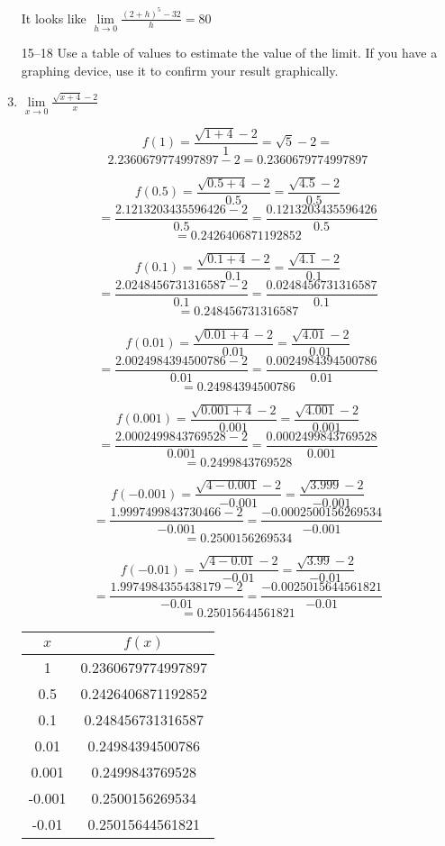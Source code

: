 \documentclass{article}
\begin{document}
\begin{enumerate}
			It looks like $\lim \limits _{h \to 0} \frac{(2 + h)^5 - 32}{h} = 80$
			
			\item[15--18] Use a table of values to estimate the value of the limit. If you have a graphing
				device, use it to confirm your result graphically.
				
			\item $\lim \limits _{x \to 0} \frac{\sqrt{x + 4} - 2}{x}$
			
				$$f(1) = \frac{\sqrt{1 + 4} - 2}{1} = \sqrt{5} - 2 = $$
				$$2.2360679774997897 - 2 = 0.2360679774997897$$
				
				$$f(0.5) = \frac{\sqrt{0.5 + 4} - 2}{0.5} =\frac{\sqrt{4.5} - 2}{0.5}$$
				$$= \frac{2.1213203435596426 - 2}{0.5} = \frac{0.1213203435596426}{0.5}$$
				$$ = 0.2426406871192852$$
				
				$$f(0.1) = \frac{\sqrt{0.1 + 4} - 2}{0.1} = \frac{\sqrt{4.1} - 2}{0.1}$$
				$$ = \frac{2.0248456731316587 - 2}{0.1} = \frac{0.0248456731316587}{0.1}$$
				$$ = 0.248456731316587$$
				
				$$f(0.01) = \frac{\sqrt{0.01 + 4}-2}{0.01} = \frac{\sqrt{4.01} - 2}{0.01}$$
				$$= \frac{2.0024984394500786 - 2}{0.01} = \frac{0.0024984394500786}{0.01}$$
				$$ = 0.24984394500786$$
				
				$$f(0.001) = \frac{\sqrt{0.001 + 4}-2}{0.001} = \frac{\sqrt{4.001} -2}{0.001}$$
				$$= \frac{2.0002499843769528-2}{0.001} = \frac{0.0002499843769528}{0.001}$$
				$$ = 0.2499843769528$$
				
				$$f(-0.001) = \frac{\sqrt{4 - 0.001} - 2}{-0.001}  =\frac{\sqrt{3.999} - 2}{-0.001}$$
				$$ = \frac{1.9997499843730466 - 2}{-0.001} = \frac{-0.0002500156269534}{-0.001}$$
				$$ = 0.2500156269534$$
				
				$$f(-0.01) = \frac{\sqrt{4 - 0.01} - 2}{-0.01} = \frac{\sqrt{3.99} - 2}{-0.01}$$
				$$= \frac{1.9974984355438179 - 2}{-0.01} = \frac{-0.0025015644561821}{-0.01}$$
				$$ = 0.25015644561821$$
				
			\begin{center}
				\begin{tabular}{|c|c|}
				\hline
				$x$ & $f(x)$ \\
				\hline \hline
				1 &  0.2360679774997897 \\
				0.5 & 0.2426406871192852 \\
				0.1 &   0.248456731316587 \\
				0.01 &  0.24984394500786 \\
				0.001 & 0.2499843769528 \\
				-0.001 &  0.2500156269534 \\
				-0.01 & 0.25015644561821 \\
				\hline
				\end{tabular}
			\end{center}
			

\end{enumerate}
\end{document}

